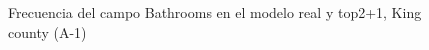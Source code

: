 \begin{figure}[H]
    \centering
    
    \caption{Frecuencia del campo Bathrooms en el modelo real y top2+1, King county (A-1)}
    \label{frecuency-top2+1-bathrooms}
\end{figure}